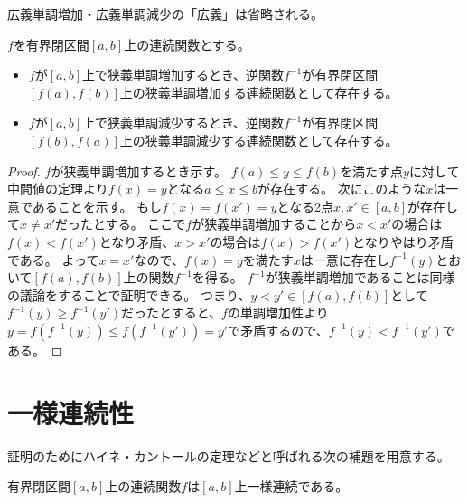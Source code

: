 広義単調増加・広義単調減少の「広義」は省略される。

\begin{theorem}[単調関数の逆関数]
$f$を有界閉区間$[a, b]$上の連続関数とする。
\begin{itemize}
\item
$f$が$[a, b]$上で狭義単調増加するとき、逆関数$f^{-1}$が有界閉区間$[f(a), f(b)]$上の狭義単調増加する連続関数として存在する。
\item
$f$が$[a, b]$上で狭義単調減少するとき、逆関数$f^{-1}$が有界閉区間$[f(b), f(a)]$上の狭義単調減少する連続関数として存在する。
\end{itemize}
\end{theorem}

\begin{proof}
$f$が狭義単調増加するとき示す。
$f(a) \le y \le f(b)$を満たす点$y$に対して中間値の定理より$f(x) = y$となる$a \le x \le b$が存在する。
次にこのような$x$は一意であることを示す。
もし$f(x) = f(x') = y$となる2点$x, x' \in [a, b]$が存在して$x \ne x'$だったとする。
ここで$f$が狭義単調増加することから$x < x'$の場合は$f(x) < f(x')$となり矛盾、$x > x'$の場合は$f(x) > f(x')$となりやはり矛盾である。
よって$x = x'$なので、$f(x) = y$を満たす$x$は一意に存在し$f^{-1}(y)$とおいて$[f(a), f(b)]$上の関数$f^{-1}$を得る。
$f^{-1}$が狭義単調増加であることは同様の議論をすることで証明できる。
つまり、$y < y' \in [f(a), f(b)]$として$f^{-1}(y) \ge f^{-1}(y')$だったとすると、$f$の単調増加性より$y = f(f^{-1}(y)) \le f(f^{-1}(y')) = y'$で矛盾するので、$f^{-1}(y) < f^{-1}(y')$である。
\end{proof}

\section{一様連続性}

証明のためにハイネ・カントールの定理などと呼ばれる次の補題を用意する。

\begin{theorem}[有界閉区間上の連続関数]
\label{t_unif_conti}
有界閉区間$[a, b]$上の連続関数$f$は$[a, b]$上一様連続である。
\end{theorem}

